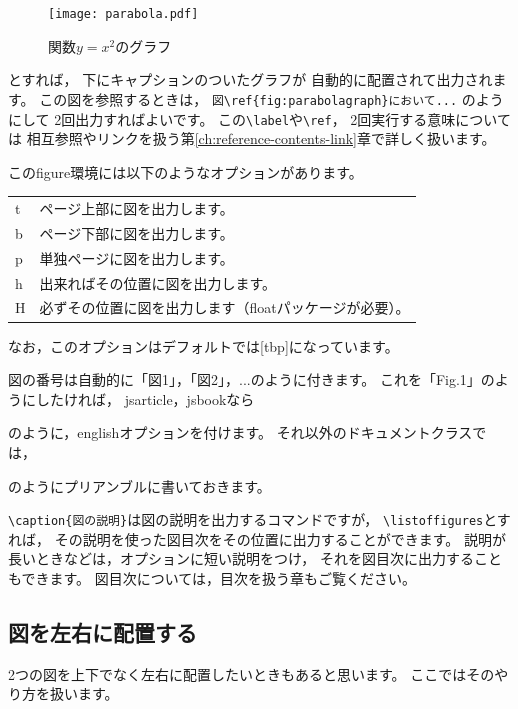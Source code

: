 \begin{ITeX}
\begin{figure}
\texttt{[image: parabola.pdf]}
\caption{関数$y = x^2$のグラフ}
\label{fig:parabolagraph}
\end{figure}
\end{ITeX}

とすれば，
下にキャプションのついたグラフが
自動的に配置されて出力されます。
この図を参照するときは，
\verb|図\ref{fig:parabolagraph}において...| のようにして
2回出力すればよいです。
この\verb|\label|や\verb|\ref|，
2回実行する意味については
相互参照やリンクを扱う第\ref{ch:reference-contents-link}章で詳しく扱います。

このfigure環境には以下のようなオプションがあります。

\begin{table}[H]
\label{tab:options-of-figure}
\begin{center}
\begin{tabular}{lp{}}
t & ページ上部に図を出力します。\tabularnewline
b & ページ下部に図を出力します。\tabularnewline
p & 単独ページに図を出力します。\tabularnewline
h & 出来ればその位置に図を出力します。\tabularnewline
H & 必ずその位置に図を出力します（floatパッケージが必要）。
\end{tabular}
\end{center}
\end{table}

なお，このオプションはデフォルトでは[tbp]になっています。

図の番号は自動的に「図1」，「図2」，...のように付きます。
これを「Fig.1」のようにしたければ，
jsarticle，jsbookなら
のように，englishオプションを付けます。
それ以外のドキュメントクラスでは，
\begin{ITeX}
\renewcommand{\figurename}{Fig.}
\end{ITeX}
のようにプリアンブルに書いておきます。

\verb|\caption{図の説明}|は図の説明を出力するコマンドですが，
\verb|\listoffigures|とすれば，
その説明を使った図目次をその位置に出力することができます。
説明が長いときなどは，オプションに短い説明をつけ，
それを図目次に出力することもできます。
図目次については，目次を扱う章もご覧ください。


\subsection{図を左右に配置する}
2つの図を上下でなく左右に配置したいときもあると思います。
ここではそのやり方を扱います。

